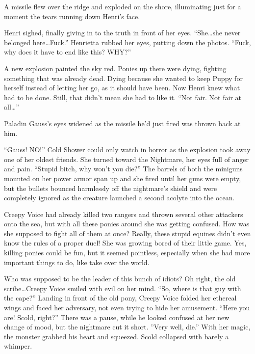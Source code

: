 \medskip

A missile flew over the ridge and exploded on the shore, illuminating just for a moment the tears running down Henri's face.

Henri sighed, finally giving in to the truth in front of her eyes. ``She\dots she never belonged here\dots Fuck.'' Henrietta rubbed her eyes, putting down the photos. ``Fuck, why does it have to end like this? WHY?''

A new explosion painted the sky red. Ponies up there were dying, fighting something that was already dead. Dying because she wanted to keep Puppy for herself instead of letting her go, as it should have been. Now Henri knew what had to be done. Still, that didn't mean she had to like it. ``Not fair. Not fair at all\dots''


\horizonline


Paladin Gauss's eyes widened as the missile he'd just fired was thrown back at him.

``Gauss! NO!'' Cold Shower could only watch in horror as the explosion took away one of her oldest friends. She turned toward the Nightmare, her eyes full of anger and pain. ``Stupid bitch, why won't you die?'' The barrels of both the miniguns mounted on her power armor span up and she fired until her guns were empty, but the bullets bounced harmlessly off the nightmare's shield and were completely ignored as the creature launched a second acolyte into the ocean.

Creepy Voice had already killed two rangers and thrown several other attackers onto the sea, but with all these ponies around she was getting confused. How was she supposed to fight all of them at once? Really, these stupid equines didn't even know the rules of a proper duel! She was growing bored of their little game. Yes, killing ponies could be fun, but it seemed pointless, especially when she had more important things to do, like take over the world.

Who was supposed to be the leader of this bunch of idiots? Oh right, the old scribe\dots Creepy Voice smiled with evil on her mind. ``So, where is that guy with the cape?'' Landing in front of the old pony, Creepy Voice folded her ethereal wings and faced her adversary, not even trying to hide her amusement. ``Here you are! Scold, right?'' There was a pause, while he looked confused at her new change of mood, but the nightmare cut it short. ''Very well, die.'' With her magic, the monster grabbed his heart and squeezed. Scold collapsed with barely a whimper.

